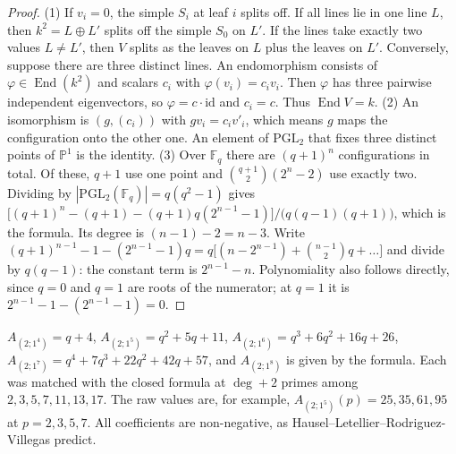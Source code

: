\documentclass[11pt]{article}
\theoremstyle{definition}\newtheorem{definition}[theorem]{Definition}\newtheorem{remark}[theorem]{Remark}\newtheorem{observation}[theorem]{Numerical observation}
\newcommand{\C}[1]{\texttt{[C-#1]}}
\begin{document}
\begin{proof}
(1) If $v_i=0$, the simple $S_i$ at leaf $i$ splits off. If all lines lie in one line $L$, then $k^2=L\oplus L'$ splits off the simple $S_0$ on $L'$.
If the lines take exactly two values $L\neq L'$, then $V$ splits as the leaves on $L$ plus the leaves on $L'$. Conversely, suppose there are three distinct lines.
An endomorphism consists of $\varphi\in\operatorname{End}(k^2)$ and scalars $c_i$ with $\varphi(v_i)=c_iv_i$. Then $\varphi$ has three pairwise
independent eigenvectors, so $\varphi=c\cdot\mathrm{id}$ and $c_i=c$. Thus $\operatorname{End}V=k$.
(2) An isomorphism is $(g,(c_i))$ with $g v_i=c_iv'_i$, which means $g$ maps the configuration onto the other one. An element of $\mathrm{PGL}_2$ that fixes three
distinct points of $\mathbb P^1$ is the identity.
(3) Over $\mathbb F_q$ there are $(q+1)^n$ configurations in total. Of these, $q+1$ use one point and $\binom{q+1}2(2^n-2)$ use exactly two.
Dividing by $|\mathrm{PGL}_2(\mathbb F_q)|=q(q^2-1)$ gives
$\big[(q+1)^n-(q+1)-(q+1)q(2^{n-1}-1)\big]/\big(q(q-1)(q+1)\big)$, which is the formula. Its degree is $(n-1)-2=n-3$. Write
$(q+1)^{n-1}-1-(2^{n-1}-1)q=q\big[(n-2^{n-1})+\binom{n-1}2q+\dots\big]$ and divide by $q(q-1)$: the constant term is $2^{n-1}-n$.
Polynomiality also follows directly, since $q=0$ and $q=1$ are roots of the numerator; at $q=1$ it is $2^{n-1}-1-(2^{n-1}-1)=0$.
\end{proof}
\begin{corollary}[Explicit Kac polynomials; Verified \C{quivers-R3-35}--\C{quivers-R3-39}]
$A_{(2;1^4)}=q+4$, $A_{(2;1^5)}=q^2+5q+11$, $A_{(2;1^6)}=q^3+6q^2+16q+26$, $A_{(2;1^7)}=q^4+7q^3+22q^2+42q+57$, and $A_{(2;1^8)}$ is given by the formula.
Each was matched with the closed formula at $\deg+2$ primes among $2,3,5,7,11,13,17$. The raw values are, for example, $A_{(2;1^5)}(p)=25,35,61,95$ at $p=2,3,5,7$.
All coefficients are non-negative, as Hausel--Letellier--Rodriguez-Villegas predict.
\end{corollary}
\end{document}
